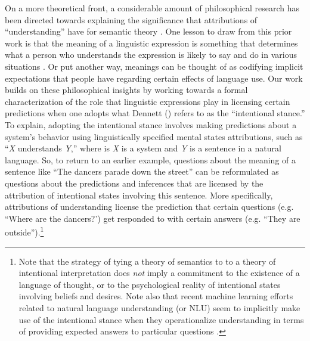 \documentclass[utf8]{frontiersSCNS} %
\begin{document}
On a more theoretical front, a considerable amount of philosophical research has been directed towards explaining the significance that attributions of ``understanding'' have for semantic theory \citep{Dennett:1987,Dennett:1991,Brandom:1994,Brandom:2000}. One lesson to draw from this prior work is that the meaning of a linguistic expression is something that determines what a person who understands the expression is likely to say and do in various situations \citep{Blouw:2017}. Or put another way, meanings can be thought of as codifying implicit expectations that people have regarding certain effects of language use. Our work builds on these philosophical insights by working towards a formal characterization of the role that linguistic expressions play in licensing certain predictions when one adopts what Dennett (\citeyear{Dennett:1987,Dennett:1991}) refers to as the ``intentional stance.'' To explain, adopting the intentional stance involves making predictions about a system's behavior using linguistically specified mental states attributions, such as ``\textit{X} understands \textit{Y},'' where is \textit{X} is a system and \textit{Y} is a sentence in a natural language. So, to return to an earlier example, questions about the meaning of a sentence like ``The dancers parade down the street'' can be reformulated as questions about the predictions and inferences that are licensed by the attribution of intentional states involving this sentence. More specifically, attributions of understanding license the prediction that certain questions (e.g. ``Where are the dancers?') get responded to with certain answers (e.g. ``They are outside'').\footnote{Note that the strategy of tying a theory of semantics to to a theory of intentional interpretation does \textit{not} imply a commitment to the existence of a language of thought, or to the psychological reality of intentional states involving beliefs and desires. Note also that recent machine learning efforts related to natural language understanding (or NLU) seem to implicitly make use of the intentional stance when they operationalize understanding in terms of providing expected answers to particular questions \citep[see e.g.,][]{Weston:2015,Weston:2016,Sukhbataar:2015}.}
\end{document}
